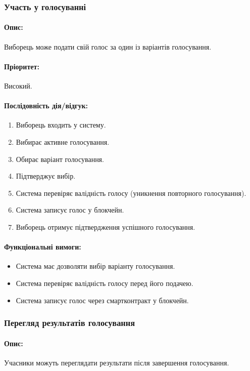 \documentclass[14pt]{extreport}
\newcounter{req}[subsubsection]
\newcommand\req{\arabic{req}\stepcounter{req}}
\begin{document}
  \subsubsection{Участь у голосуванні}  
  \paragraph{Опис:} Виборець може подати свій голос за один із варіантів голосування.  
  \paragraph{Пріоритет:} Високий.  
  \paragraph{Послідовність дія/відгук:}  
  \begin{enumerate}  
      \item Виборець входить у систему.  
      \item Вибирає активне голосування.  
      \item Обирає варіант голосування.  
      \item Підтверджує вибір.  
      \item Система перевіряє валідність голосу (уникнення повторного голосування).  
      \item Система записує голос у блокчейн.  
      \item Виборець отримує підтвердження успішного голосування.  
  \end{enumerate}  
  \paragraph{Функціональні вимоги:}  
  \begin{itemize}[leftmargin=*,label=REQ-.\req:]  
      \item Система має дозволяти вибір варіанту голосування.  
      \item Система перевіряє валідність голосу перед його подачею.  
      \item Система записує голос через смартконтракт у блокчейн.  
  \end{itemize}  

  \subsubsection{Перегляд результатів голосування}  
  \paragraph{Опис:} Учасники можуть переглядати результати після завершення голосування.  
\end{document}
